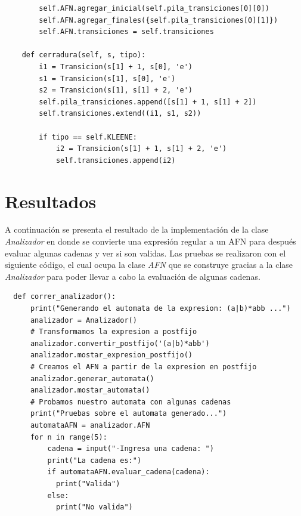 \documentclass[titlepage]{article}
\begin{document}
\begin{lstlisting}
		self.AFN.agregar_inicial(self.pila_transiciones[0][0])
		self.AFN.agregar_finales({self.pila_transiciones[0][1]})
		self.AFN.transiciones = self.transiciones
	
	def cerradura(self, s, tipo):
		i1 = Transicion(s[1] + 1, s[0], 'e')
		s1 = Transicion(s[1], s[0], 'e')
		s2 = Transicion(s[1], s[1] + 2, 'e')
		self.pila_transiciones.append([s[1] + 1, s[1] + 2])
		self.transiciones.extend((i1, s1, s2))
	
		if tipo == self.KLEENE:
			i2 = Transicion(s[1] + 1, s[1] + 2, 'e')
			self.transiciones.append(i2)
  \end{lstlisting}
  \section{Resultados}
  A continuación se presenta el resultado de la implementación de la clase \emph{Analizador} en donde se convierte una expresión regular 
  a un AFN para después evaluar algunas cadenas y ver si son validas. Las pruebas se realizaron con el siguiente código, el cual ocupa la clase 
  \emph{AFN} que se construye gracias a la clase \emph{Analizador} para poder llevar a cabo la evaluación de algunas cadenas.
  
  \begin{lstlisting}
  def correr_analizador():
	  print("Generando el automata de la expresion: (a|b)*abb ...")
	  analizador = Analizador()
	  # Transformamos la expresion a postfijo
	  analizador.convertir_postfijo('(a|b)*abb')
	  analizador.mostar_expresion_postfijo()
	  # Creamos el AFN a partir de la expresion en postfijo
	  analizador.generar_automata()
	  analizador.mostar_automata()
	  # Probamos nuestro automata con algunas cadenas
	  print("Pruebas sobre el automata generado...")
	  automataAFN = analizador.AFN
	  for n in range(5):
		  cadena = input("-Ingresa una cadena: ")
		  print("La cadena es:")
		  if automataAFN.evaluar_cadena(cadena):
		  	print("Valida")
		  else:
		  	print("No valida")
  \end{lstlisting}
  
\end{document}
